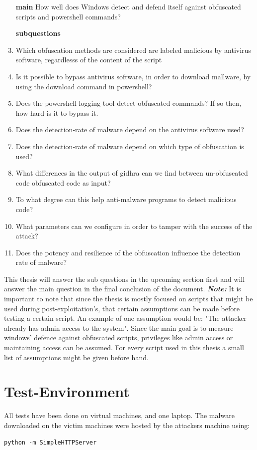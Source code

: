 \documentclass{article}%
\begin{document}
\begin{enumerate}
	\item[\textbf{main}]How well does Windows detect and defend itself against obfuscated scripts and powershell commands?
	\item[\textbf{subquestions}]
	\item Which obfuscation methods are considered are labeled malicious by antivirus software, regardlesss of the content of the script
	\item Is it possible to bypass antivirus software, in order to download mallware, by using the download command in powershell?
	\item Does the powershell logging tool detect obfuscated commands? If so then, how hard is it to bypass it.
	\item Does the detection-rate of malware depend on the antivirus software used?
	\item Does the detection-rate of malware depend on which type of obfuscation is used?
	\item What differences in the output of gidhra can we find between un-obfuscated code obfuscated code as input?
	\item To what degree can this help anti-malware programs to detect malicious code?
	\item What parameters can we configure in order to tamper with the success of the attack?
	\item Does the potency and resilience of the obfuscation influence the detection rate of
malware?
\end{enumerate}
This thesis will answer the sub questions in the upcoming section first and will answer the main question in the final conclusion of the document.
\newline
\newline
\textbf{\textit{Note:}} It is important to note that since the thesis is mostly focused on scripts that might be used during post-exploitation's, that certain assumptions can be made before testing a certain script. An example of one assumption would be: "The attacker already has admin access to the system". Since the main goal is to measure windows' defence against obfuscated scripts, privileges like admin access or maintaining access can be assumed. For every script used in this thesis a small list of assumptions might be given before hand.

\section{Test-Environment}
All tests have been done on virtual machines, and one laptop. The malware downloaded on the victim machines were hosted by the attackers machine using:
\begin{verbatim}
python -m SimpleHTTPServer
\end{verbatim}
\end{document}
